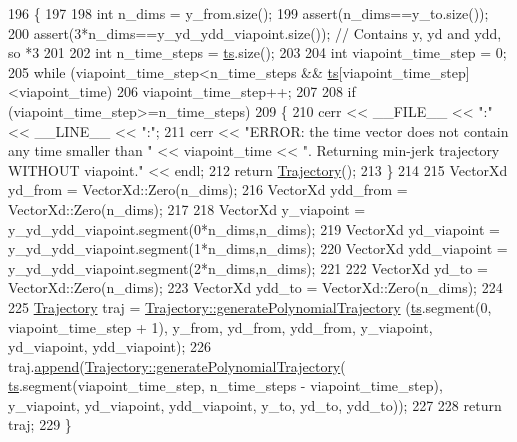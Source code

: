 \begin{DoxyCode}
196 \{
197   
198   \textcolor{keywordtype}{int} n\_dims = y\_from.size();
199   assert(n\_dims==y\_to.size());
200   assert(3*n\_dims==y\_yd\_ydd\_viapoint.size()); \textcolor{comment}{// Contains y, yd and ydd, so *3}
201   
202   \textcolor{keywordtype}{int} n\_time\_steps = \hyperlink{classDmpBbo_1_1Trajectory_a0ac526fb2e2e77134906a4b657d795d2}{ts}.size();
203   
204   \textcolor{keywordtype}{int} viapoint\_time\_step = 0;
205   \textcolor{keywordflow}{while} (viapoint\_time\_step<n\_time\_steps && \hyperlink{classDmpBbo_1_1Trajectory_a0ac526fb2e2e77134906a4b657d795d2}{ts}[viapoint\_time\_step]<viapoint\_time)
206     viapoint\_time\_step++;
207   
208   \textcolor{keywordflow}{if} (viapoint\_time\_step>=n\_time\_steps)
209   \{
210     cerr << \_\_FILE\_\_ << \textcolor{stringliteral}{":"} << \_\_LINE\_\_ << \textcolor{stringliteral}{":"};
211     cerr << \textcolor{stringliteral}{"ERROR: the time vector does not contain any time smaller than "} << viapoint\_time << \textcolor{stringliteral}{".
       Returning min-jerk trajectory WITHOUT viapoint."} <<  endl;
212     \textcolor{keywordflow}{return} \hyperlink{classDmpBbo_1_1Trajectory_aa635b61a4223224b821d156a27dbb2b8}{Trajectory}();
213   \}
214 
215   VectorXd yd\_from        = VectorXd::Zero(n\_dims);
216   VectorXd ydd\_from       = VectorXd::Zero(n\_dims);
217 
218   VectorXd y\_viapoint     = y\_yd\_ydd\_viapoint.segment(0*n\_dims,n\_dims);
219   VectorXd yd\_viapoint    = y\_yd\_ydd\_viapoint.segment(1*n\_dims,n\_dims);
220   VectorXd ydd\_viapoint   = y\_yd\_ydd\_viapoint.segment(2*n\_dims,n\_dims);
221 
222   VectorXd yd\_to          = VectorXd::Zero(n\_dims);
223   VectorXd ydd\_to         = VectorXd::Zero(n\_dims);
224 
225   \hyperlink{classDmpBbo_1_1Trajectory_aa635b61a4223224b821d156a27dbb2b8}{Trajectory} traj = \hyperlink{classDmpBbo_1_1Trajectory_ab6d25078b7d7df08ad3cd8772d969034}{Trajectory::generatePolynomialTrajectory}
      (\hyperlink{classDmpBbo_1_1Trajectory_a0ac526fb2e2e77134906a4b657d795d2}{ts}.segment(0, viapoint\_time\_step + 1), y\_from, yd\_from, ydd\_from, y\_viapoint, yd\_viapoint, ydd\_viapoint);
226   traj.\hyperlink{classDmpBbo_1_1Trajectory_aac6f333ab80eb78ad2ff3cab4e8326ec}{append}(\hyperlink{classDmpBbo_1_1Trajectory_ab6d25078b7d7df08ad3cd8772d969034}{Trajectory::generatePolynomialTrajectory}(
      \hyperlink{classDmpBbo_1_1Trajectory_a0ac526fb2e2e77134906a4b657d795d2}{ts}.segment(viapoint\_time\_step, n\_time\_steps - viapoint\_time\_step), y\_viapoint, yd\_viapoint, ydd\_viapoint,
       y\_to, yd\_to, ydd\_to));
227 
228   \textcolor{keywordflow}{return} traj;
229 \}
\end{DoxyCode}


